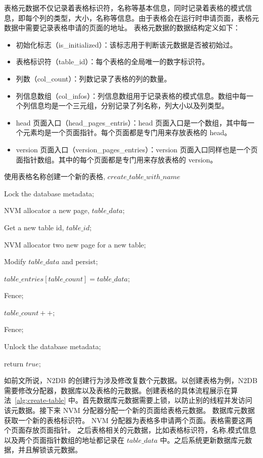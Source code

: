 表格元数据不仅记录着表格标识符，名称等基本信息，同时记录着表格的模式信息，即每个列的类型，大小，名称等信息。由于表格会在运行时申请页面，表格元数据中需要记录表格申请的页面的地址。
表格元数据的数据结构定义如下：
\begin{itemize}
    \item 初始化标志（is\_initialized）：该标志用于判断该元数据是否被初始过。
    \item 表格标识符（table\_id）：每个表格的全局唯一的数字标识符。
    \item 列数（col\_count）：列数记录了表格的列的数量。
    \item 列信息数组（col\_infos）：列信息数组用于记录表格的模式信息。数组中每一个列信息均是一个三元组，分别记录了列名称，列大小以及列类型。
    \item head 页面入口（head\_pages\_entris）：head 页面入口是一个数组，其中每一个元素均是一个页面指针。每个页面都是专门用来存放表格的 head。
    \item version 页面入口（version\_pages\_entries）：version 页面入口同样也是一个页面指针数组。其中的每个页面都是专门用来存放表格的 version。
\end{itemize}


\begin{algorithm}[ht]
    \caption{使用表格名称创建一个新的表格, $create\_table\_with\_name$}
    \label{alg:create-table}
    \BlankLine
    Lock the database metadata;


    NVM allocator a new page, $table\_data$;

    Get a new table id, $table\_id$;

    NVM allocator two new page for a new table;

    Modify $table\_data$ and persist;

    $table\_entries[table\_count] = table\_data$;

    Fence;

    $table\_count++$;

    Fence;

    Unlock the database metadata;

    return $true$;
\end{algorithm}

如前文所说，N2DB 的创建行为涉及修改复数个元数据。以创建表格为例，N2DB 需要修改分配器，数据库以及表格的元数据。创建表格的具体流程展示在算法~\ref{alg:create-table} 中。首先数据库元数据需要上锁，以防止别的线程并发访问该元数据。接下来 NVM 分配器分配一个新的页面给表格元数据。
数据库元数据获取一个新的表格标识符。
NVM 分配器为表格多申请两个页面。表格需要这两个页面存放页面指针。
之后表格相关的元数据，比如表格标识符，名称,模式信息以及两个页面指针数组的地址都记录在 $table\_data$ 中。之后系统更新数据库元数据，并且解锁该元数据。

